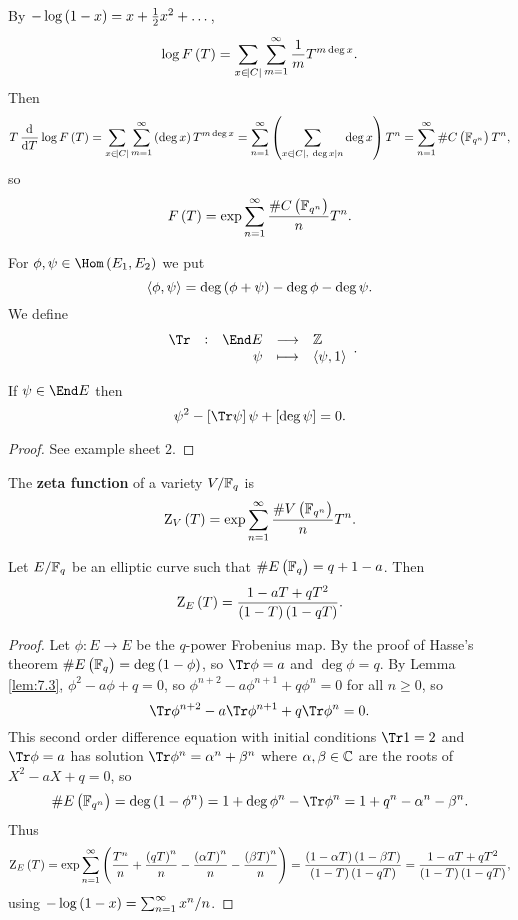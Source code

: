 \pagebreak

By $ -\log \br{1 - x} = x + \tfrac{1}{2}x^2 + \dots $,
$$ \log F\br{T} = \sum_{x \in \abs{C}} \sum_{m = 1}^\infty \dfrac{1}{m}T^{m\deg x}. $$
Then
$$ T\dod{}{T}\log F\br{T} = \sum_{x \in \abs{C}} \sum_{m = 1}^\infty \br{\deg x}T^{m\deg x} = \sum_{n = 1}^\infty \br{\sum_{x \in \abs{C}, \ \deg x \mid n} \deg x}T^n = \sum_{n = 1}^\infty \#C\br{\FF_{q^n}}T^n, $$
so
$$ F\br{T} = \exp \sum_{n = 1}^\infty \dfrac{\#C\br{\FF_{q^n}}}{n}T^n. $$


For $ \phi, \psi \in \Hom\br{E_1, E_2} $ we put
$$ \abr{\phi, \psi} = \deg \br{\phi + \psi} - \deg \phi - \deg \psi. $$
We define
$$ \function[\Tr]{\End E}{\ZZ}{\psi}{\abr{\psi, 1}}. $$

\begin{lemma}
\label{lem:7.3}
If $ \psi \in \End E $ then
$$ \psi^2 - \sbr{\Tr \psi}\psi + \sbr{\deg \psi} = 0. $$
\end{lemma}

\begin{proof}
See example sheet $ 2 $.
\end{proof}

\begin{definition*}
The \textbf{zeta function} of a variety $ V / \mathbb{F}_q $ is
$$ \Z_V\br{T} = \exp \sum_{n = 1}^\infty \dfrac{\#V\br{\FF_{q^n}}}{n}T^n. $$
\end{definition*}

\begin{lemma}
Let $ E / \mathbb{F}_q $ be an elliptic curve such that $ \#E\br{\FF_q} = q + 1 - a $. Then
$$ \Z_E\br{T} = \dfrac{1 - aT + qT^2}{\br{1 - T}\br{1 - qT}}. $$
\end{lemma}

\begin{proof}
Let $ \phi : E \to E $ be the $ q $-power Frobenius map. By the proof of Hasse's theorem $ \#E\br{\FF_q} = \deg \br{1 - \phi} $, so $ \Tr \phi = a $ and $ \deg \phi = q $. By Lemma \ref{lem:7.3}, $ \phi^2 - a\phi + q = 0 $, so $ \phi^{n + 2} - a\phi^{n + 1} + q\phi^n = 0 $ for all $ n \ge 0 $, so
$$ \Tr \phi^{n + 2} - a\Tr \phi^{n + 1} + q\Tr \phi^n = 0. $$
This second order difference equation with initial conditions $ \Tr 1 = 2 $ and $ \Tr \phi = a $ has solution $ \Tr \phi^n = \alpha^n + \beta^n $ where $ \alpha, \beta \in \mathbb{C} $ are the roots of $ X^2 - aX + q = 0 $, so
$$ \#E\br{\FF_{q^n}} = \deg \br{1 - \phi^n} = 1 + \deg \phi^n - \Tr \phi^n = 1 + q^n - \alpha^n - \beta^n. $$
Thus
$$ \Z_E\br{T} = \exp \sum_{n = 1}^\infty \br{\dfrac{T^n}{n} + \dfrac{\br{qT}^n}{n} - \dfrac{\br{\alpha T}^n}{n} - \dfrac{\br{\beta T}^n}{n}} = \dfrac{\br{1 - \alpha T}\br{1 - \beta T}}{\br{1 - T}\br{1 - qT}} = \dfrac{1 - aT + qT^2}{\br{1 - T}\br{1 - qT}}, $$
using $ -\log \br{1 - x} = \sum_{n = 1}^\infty x^n / n $.
\end{proof}

